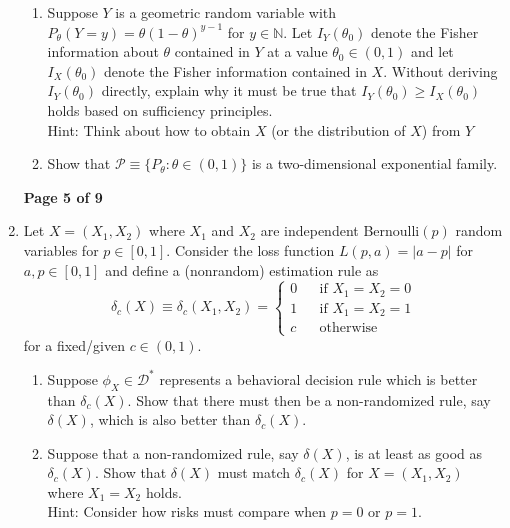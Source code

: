 \documentclass[12pt]{article}
\begin{document}
\begin{enumerate}
\begin{enumerate}
\item Suppose $Y$ is a geometric random variable with $P_\theta(Y=y) = \theta (1-\theta)^{y-1}$ for $y\in \mathbb{N}$.
Let $I_Y(\theta_0)$ denote the Fisher information about $\theta$ contained in $Y$ at a value $\theta_0\in(0,1)$ and
let $I_X(\theta_0)$ denote the Fisher information contained in $X$.
Without deriving $I_Y(\theta_0)$ directly, explain why it must be true that $I_Y(\theta_0)\geq I_X(\theta_0)$ holds
based on sufficiency principles.\\[.1cm]
Hint: Think about how to obtain $X$ (or the distribution of $X$) from $Y$\\[5in]

 \item Show that $\mathcal{P}\equiv \{P_\theta:\theta\in(0,1)\}$ is a two-dimensional exponential family.

\end{enumerate}



\newpage
\textbf{\hspace*{1cm} \hfill Page 5 of 9}



\item Let $X=(X_1,X_2)$ where $X_1$ and $X_2$ are independent Bernoulli$(p)$ random variables for $p\in[0,1]$.
Consider the loss function $L(p,a)=|a-p|$ for $a,p\in[0,1]$ and define a (nonrandom) estimation rule  as
\[
 \delta_c(X) \equiv \delta_c(X_1,X_2) = \left\{\begin{array}{lcl}
 0 &&\mbox{if $X_1=X_2=0$}\\
 1 &&\mbox{if $X_1=X_2=1$}\\
 c &&\mbox{otherwise}
\end{array}
    \right.
\]
for a fixed/given $c\in(0,1)$.


\begin{enumerate}
\item  Suppose $\phi_X \in \mathcal{D}^*$ represents a behavioral decision rule
which is better than    $\delta_c(X)$.  Show that there must then be   a non-randomized rule, say $\delta(X)$,  which is also better than
$\delta_c(X)$.\\[4.3in]


\item Suppose that a non-randomized rule, say $\delta(X)$,  is at least as good as
$\delta_c(X)$.  Show that $\delta(X)$ must match $\delta_c(X)$ for $X=(X_1,X_2)$ where $X_1=X_2$ holds.\\[.1cm]
Hint: Consider  how risks must compare when $p=0$ or $p=1$.



\end{enumerate}
\end{enumerate}
\end{document}

